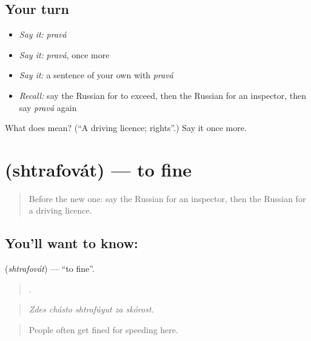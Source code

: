 \subsection*{Your turn}
\begin{itemize}
\raggedright
  \item \emph{Say it:} \emph{pravá}
  \item \emph{Say it:} \emph{pravá}, once more
  \item \emph{Say it:} a sentence of your own with \emph{pravá}
  \item \emph{Recall:} say the Russian for to exceed, then the Russian for an inspector, then say \emph{pravá} again
\end{itemize}

\begin{tcolorbox}[breakable,colback=teal!4,colframe=teal!35!black,title={Before you move on}]
What does  mean? (\textquotedblleft{}A driving licence; rights\textquotedblright{}.) Say it once more.
\end{tcolorbox}
\section[\texorpdfstring{\ru{штрафовать} (shtrafovát)}{штрафовать (shtrafovát)}]{ (shtrafovát) — to fine}

\label{lesson:RU-C408-shtrafovat}



\begin{quote}
Before the new one: say the Russian for an inspector, then the Russian for a driving licence.
\end{quote}

\subsection*{You'll want to know: }
\textbf{} (\emph{shtrafovát}) — \textquotedblleft{}to fine\textquotedblright{}.

\begin{quote}
    .
\end{quote}

\begin{quote}
\emph{Zdes chásto shtrafúyut za skórost.}
\end{quote}

\begin{quote}
People often get fined for speeding here.
\end{quote}

